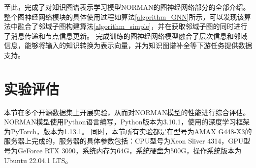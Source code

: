 \documentclass[algorithmlist, AutoFakeBold, AutoFakeSlant, figurelist, tablelist, nomlist, engineering]{seuthesix}
\begin{document}
至此，完成了对知识图谱表示学习模型NORMAN的图神经网络部分的全部介绍。
整个图神经网络模块的具体使用过程如算法\ref{algorithm_GNN}所示，可以发现该算法中融合了邻域子图构建算法\ref{algorithm_simple}，并在获取邻域子图的同时进行了消息传递和节点信息更新。
完成训练的图神经网络模型融合了层次信息和邻域信息，能够将输入的知识转换为表示向量，并为知识图谱补全等下游任务提供数据支持。


\section{实验评估}
本节在多个开源数据集上开展实验，从而对NORMAN模型的性能进行综合评估。
NORMAN模型使用Python语言编写，Python版本为3.10.1，使用的深度学习框架为PyTorch，版本为1.13.1。
同时，本节所有实验都是在型号为AMAX G448-X3的服务器上完成的，服务器的具体参数包括：CPU型号为Xeon Sliver 4314，GPU型号为GeForce RTX 3090，系统内存为64G，系统硬盘为500G，操作系统版本为Ubuntu 22.04.1 LTS。
\end{document}

